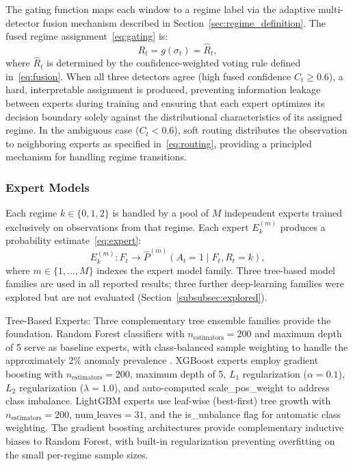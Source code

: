 \documentclass[]{interact}
\begin{document}
The gating function maps each window to a regime label via the adaptive multi-detector fusion mechanism described in Section~\ref{sec:regime_definition}. The fused regime assignment~\eqref{eq:gating} is:
\begin{equation}
    R_t = g(\sigma_t) = \hat{R}_t,
    \label{eq:gating}
\end{equation}
where $\hat{R}_t$ is determined by the confidence-weighted voting rule defined in~\eqref{eq:fusion}. When all three detectors agree (high fused confidence $C_t \geq 0.6$), a hard, interpretable assignment is produced, preventing information leakage between experts during training and ensuring that each expert optimizes its decision boundary solely against the distributional characteristics of its assigned regime. In the ambiguous case ($C_t < 0.6$), soft routing distributes the observation to neighboring experts as specified in~\eqref{eq:routing}, providing a principled mechanism for handling regime transitions.

\subsubsection{Expert Models}

Each regime $k \in \{0, 1, 2\}$ is handled by a pool of $M$ independent experts trained exclusively on observations from that regime. Each expert $E_k^{(m)}$ produces a probability estimate~\eqref{eq:expert}:
\begin{equation}
    E_k^{(m)} : F_t \rightarrow \hat{P}^{(m)}(A_t = 1 \mid F_t, R_t = k),
    \label{eq:expert}
\end{equation}
where $m \in \{1, \ldots, M\}$ indexes the expert model family. Three tree-based model families are used in all reported results; three further deep-learning families were explored but are not evaluated (Section~\ref{subsubsec:explored}).

Tree-Based Experts: Three complementary tree ensemble families provide the foundation. Random Forest classifiers with $n_{\text{estimators}} = 200$ and maximum depth of 5 serve as baseline experts, with class-balanced sample weighting to handle the approximately 2\% anomaly prevalence \citep{breiman2001random}. XGBoost experts \citep{chen2016xgboost} employ gradient boosting with $n_{\text{estimators}} = 200$, maximum depth of 5, $L_1$ regularization ($\alpha = 0.1$), $L_2$ regularization ($\lambda = 1.0$), and auto-computed scale\_pos\_weight to address class imbalance. LightGBM experts \citep{ke2017lightgbm} use leaf-wise (best-first) tree growth with $n_{\text{estimators}} = 200$, $\text{num\_leaves} = 31$, and the is\_unbalance flag for automatic class weighting. The gradient boosting architectures provide complementary inductive biases to Random Forest, with built-in regularization preventing overfitting on the small per-regime sample sizes.
\end{document}
